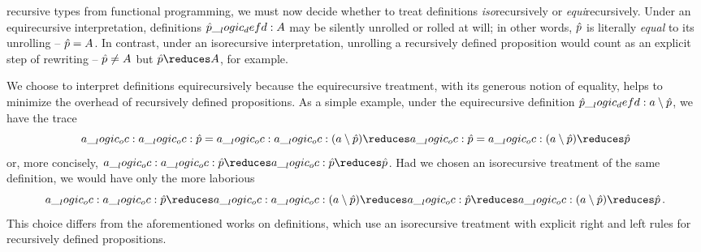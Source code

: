  recursive types from functional programming\autocite{??}, we must now decide whether to treat definitions \emph{iso}\-re\-cur\-sively or \emph{equi}\-re\-cur\-sively.
Under an equirecursive interpretation, definitions $\hat{p} \__logic_defd: A$ may be silently unrolled or rolled at will;
in other words, $\hat{p}$ is literally \emph{equal} to its unrolling -- $\hat{p} = A$.
In contrast, under an isorecursive interpretation, unrolling a recursively defined proposition would count as an explicit step of rewriting -- $\hat{p} \neq A$ but $\defp{p} \reduces A$, for example.


We choose to interpret definitions equirecursively
because the equirecursive treatment, with its generous notion of equality, helps to minimize the overhead of recursively defined propositions.
As a simple example, under the equirecursive definition $\hat{p} \__logic_defd: a \mathbin { \setminus } \hat{p}$, we have the trace
\begin{equation*}
  a \oc a \oc \defp{p} = a \oc a \oc (a \limp \defp{p}) \reduces a \oc \defp{p} = a \oc (a \limp \defp{p}) \reduces \defp{p}
\end{equation*}
or, more concisely, $a \oc a \oc \defp{p} \reduces a \oc \defp{p} \reduces \defp{p}$.
Had we chosen
 an isorecursive treatment of the same definition, we would have only the more laborious
\begin{equation*}
  a \oc a \oc \defp{p} \reduces a \oc a \oc (a \limp \defp{p}) \reduces a \oc \defp{p} \reduces a \oc (a \limp \defp{p}) \reduces \defp{p}
  \,.
\end{equation*}
This choice differs from the aforementioned works on definitions, which use an isorecursive treatment with explicit right and left rules for recursively defined propositions.


